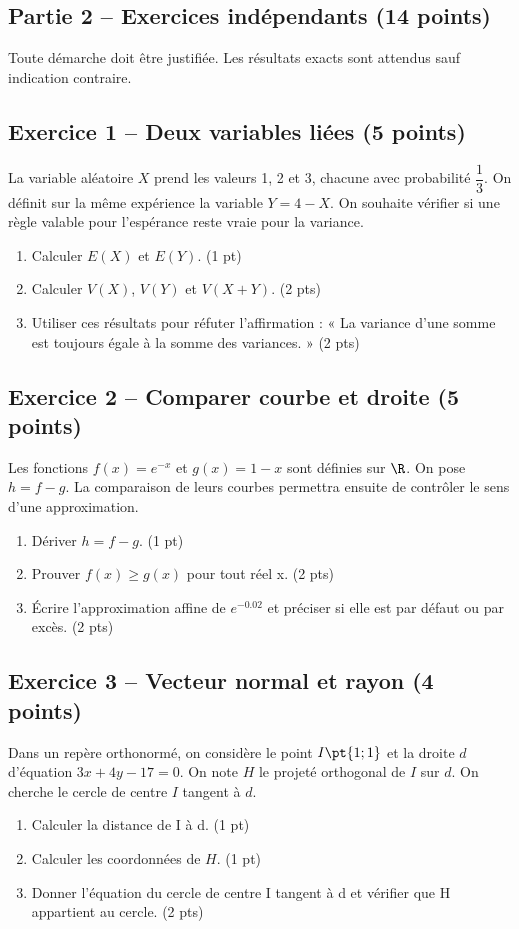\mxnewpage\subsection*{Partie 2 -- Exercices indépendants (14 points)}
Toute démarche doit être justifiée. Les résultats exacts sont attendus sauf indication contraire.
\subsection*{Exercice 1 -- Deux variables liées (5 points)}
La variable aléatoire $X$ prend les valeurs 1, 2 et 3, chacune avec probabilité $\dfrac13$. On définit sur la même expérience la variable $Y=4-X$. On souhaite vérifier si une règle valable pour l’espérance reste vraie pour la variance.
\begin{enumerate}
\item Calculer $E(X)$ et $E(Y)$. \hfill(1 pt)
\item Calculer $V(X)$, $V(Y)$ et $V(X+Y)$. \hfill(2 pts)
\item Utiliser ces résultats pour réfuter l’affirmation : « La variance d’une somme est toujours égale à la somme des variances. » \hfill(2 pts)
\end{enumerate}
\subsection*{Exercice 2 -- Comparer courbe et droite (5 points)}
Les fonctions $f(x)=e^{-x}$ et $g(x)=1-x$ sont définies sur $\R$. On pose $h=f-g$. La comparaison de leurs courbes permettra ensuite de contrôler le sens d’une approximation.
\begin{enumerate}
\item Dériver $h=f-g$. \hfill(1 pt)
\item Prouver $f(x)\geq g(x)$ pour tout réel x. \hfill(2 pts)
\item Écrire l’approximation affine de $e^{-\num{0,02}}$ et préciser si elle est par défaut ou par excès. \hfill(2 pts)
\end{enumerate}
\subsection*{Exercice 3 -- Vecteur normal et rayon (4 points)}
Dans un repère orthonormé, on considère le point $I\pt{1;1}$ et la droite $d$ d’équation $3x+4y-17=0$. On note $H$ le projeté orthogonal de $I$ sur $d$. On cherche le cercle de centre $I$ tangent à $d$.
\begin{enumerate}
\item Calculer la distance de I à d. \hfill(1 pt)
\item Calculer les coordonnées de $H$. \hfill(1 pt)
\item Donner l’équation du cercle de centre I tangent à d et vérifier que H appartient au cercle. \hfill(2 pts)
\end{enumerate}
